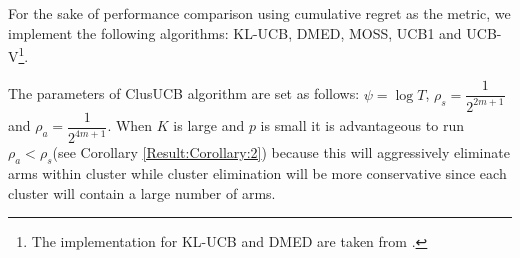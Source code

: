 %
%
%
%
%
%
%
%


For the sake of performance comparison using cumulative regret as the metric, we implement the following algorithms:  KL-UCB\cite{garivier2011kl}, DMED\cite{honda2010asymptotically}, MOSS\cite{audibert2009minimax}, UCB1\cite{auer2002finite} and UCB-V\cite{audibert2009exploration}\footnote{The implementation for KL-UCB and DMED are taken from \cite{CapGarKau12}.}.

The parameters of ClusUCB algorithm are set as follows: $\psi=\log T$, $\rho_{s}=\dfrac{1}{2^{2m+1}}$ and $\rho_{a}=\dfrac{1}{2^{4m+1}}$. When $K$ is large and $p$ is small it is advantageous to run $\rho_{a} < \rho_{s}$(see Corollary \ref{Result:Corollary:2}) because this will aggressively eliminate arms within cluster while cluster elimination will be more conservative since each cluster will contain a large number of arms.

